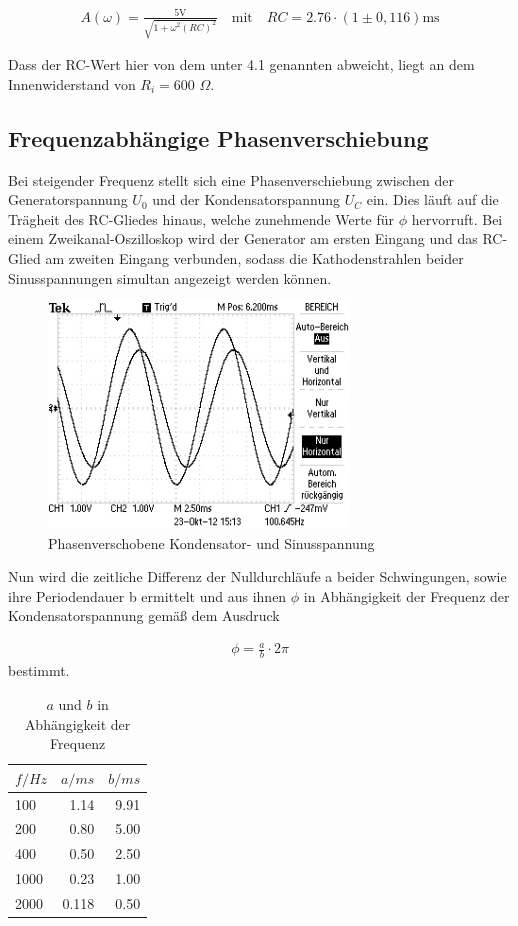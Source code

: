 \begin{align}
A(\omega)= \frac{5\text{V}}{\sqrt{1+\omega^2(RC)^2}} \quad \text{mit} \quad RC = 2.76\cdot(1\pm0,116)\text{ms}
\end{align}

Dass der RC-Wert hier von dem unter 4.1 genannten abweicht, liegt an dem Innenwiderstand von $R_i = 600$ $\Omega$.

\subsection{Frequenzabhängige Phasenverschiebung}
Bei steigender Frequenz stellt sich eine Phasenverschiebung zwischen der Generatorspannung $U_0$ und der Kondensatorspannung 
$U_C$ ein. Dies läuft auf die Trägheit des RC-Gliedes hinaus, welche zunehmende Werte für $\phi$ hervorruft. Bei einem 
Zweikanal-Oszilloskop wird der Generator am ersten Eingang und das RC-Glied am zweiten Eingang verbunden, sodass die Kathodenstrahlen
beider Sinusspannungen simultan angezeigt werden können.
\begin{figure}[htbp]
\includegraphics[width=8cm] {_pics/Phi.JPG}
\centering
\caption{Phasenverschobene Kondensator- und Sinusspannung}
\end{figure}

Nun wird die zeitliche Differenz der Nulldurchläufe a beider Schwingungen, sowie ihre Periodendauer b ermittelt und aus ihnen
$\phi$ in Abhängigkeit der Frequenz der Kondensatorspannung gemäß dem Ausdruck 

\begin{align}
 \phi = \frac{a}{b} \cdot 2 \pi 
\end{align}
bestimmt.

\begin{table}[H]
\begin{tabular}{l|r|r}
$f/Hz$ & $a/ms$	& $b/ms$\\
\hline
100 &	1.14 &	9.91\\
200 &	0.80 &	5.00\\
400 &	0.50 &	2.50\\
1000 &	0.23 &	1.00\\
2000 &	0.118 &	0.50
\end{tabular}
\caption{$a$ und $b$ in Abhängigkeit der Frequenz}
\centering
\end{table}


